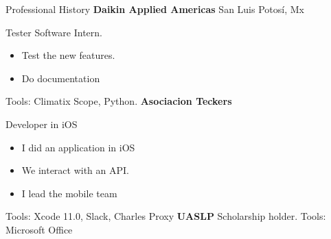 \begin{rubric}{Professional History}
\entry*[2020 -- currently]
    \textbf{Daikin Applied Americas} San Luis Potosí, Mx\par
    Tester Software Intern.
	\begin{itemize}
	    \item Test the new features. 
	    \item Do documentation
	\end{itemize}
	Tools: Climatix Scope, Python.
\entry*[2019 -- 2020]
    \textbf{Asociacion Teckers  }  \par
    Developer in iOS
	\begin{itemize}
	    \item I did an application in iOS 
	    \item We interact with an API.
	    \item I lead the mobile team 
	\end{itemize}	
    Tools: Xcode 11.0, Slack, Charles Proxy
%
%
\entry*[2018 -- 2019 ]
\textbf{UASLP}  Scholarship holder.
Tools: Microsoft Office

\end{rubric}
